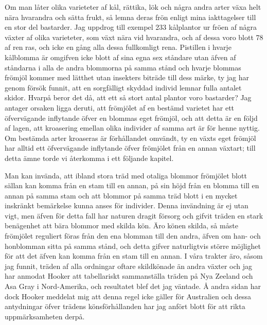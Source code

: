 Om man låter olika varieteter af kål, rättika, lök och några andra arter växa helt nära hvarandra och sätta frukt, så lemna deras frön enligt mina iakttagelser till en stor del bastarder. Jag uppdrog till exempel 233 kålplantor ur fröen af några växter af olika varieteter, som växt nära vid hvarandra, och af dessa voro blott 78 af ren ras, och icke en gång alla dessa fullkomligt rena. Pistillen i hvarje kålblomma är omgifven icke blott af sina egna sex ståndare utan äfven af ståndarna i alla de andra blommorna på samma stånd och hvarje blommas frömjöl kommer med lätthet utan insekters biträde till dess märke, ty jag har genom försök funnit, att en sorgfälligt skyddad individ lemnar fulla antalet skidor. Hvarpå beror det då, att ett så stort antal plantor voro bastarder? Jag antager orsaken ligga deruti, att frömjölet af en bestämd varietet har ett öfvervägande inflytande öfver en blommas eget frömjöl, och att detta är en följd af lagen, att kroasering emellan olika individer af samma art är för henne nyttig. Om bestämda arter kroaseras är förhållandet omvändt, ty en växts eget frömjöl har alltid ett öfvervägande inflytande öfver frömjölet från en annan växtart; till detta ämne torde vi återkomma i ett följande kapitel.

Man kan invända, att ibland stora träd med otaliga blommor frömjölet blott sällan kan komma från en stam till en annan, på sin höjd från en blomma till en annan på samma stam och att blommor på samma träd blott i en mycket inskränkt bemärkelse kunna anses för individer. Denna invändning är ej utan vigt, men äfven för detta fall har naturen dragit försorg och gifvit träden en stark benägenhet att bära blommor med skilda kön. Äro könen skilda, så måste frömjölet reguliert föras från den ena blomman till den andra, äfven om han- och honblomman sitta på samma stånd, och detta gifver naturligtvis större möjlighet för att det äfven kan komma från en stam till en annan. I våra trakter äro, såsom jag funnit, träden af alla ordningar oftare skildkönade än andra växter och jag har anmodat Hooker att tabellariskt sammanställa träden på Nya Zeeland och Asa Gray i Nord-Amerika, och resultatet blef det jag väntade. Å andra sidan har dock Hooker meddelat mig att denna regel icke gäller för Australien och dessa antydningar öfver trädens könsförhållanden har jag anfört blott för att rikta uppmärksamheten derpå.

